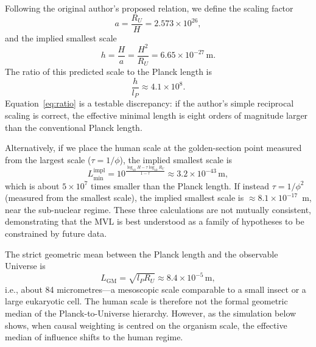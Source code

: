 \documentclass[11pt,a4paper]{article}
\begin{document}
Following the original author's proposed relation, we define the scaling factor
\begin{equation}
a = \frac{R_U}{H} = 2.573\times 10^{26},
\label{eq:a}
\end{equation}
and the implied smallest scale
\begin{equation}
h = \frac{H}{a} = \frac{H^2}{R_U} = 6.65\times 10^{-27}\,\mathrm{m}.
\label{eq:h}
\end{equation}
The ratio of this predicted scale to the Planck length is
\begin{equation}
\frac{h}{l_P} \approx 4.1\times 10^{8}.
\label{eq:ratio}
\end{equation}
Equation~\eqref{eq:ratio} is a testable discrepancy: if the author's simple reciprocal scaling is correct, the effective minimal length is eight orders of magnitude larger than the conventional Planck length.

Alternatively, if we place the human scale at the golden-section point measured from the largest scale ($\tau = 1/\phi$), the implied smallest scale is
\begin{equation}
L_{\min}^{\mathrm{impl}} = 10^{\frac{\log_{10} H - \tau\log_{10} R_U}{1-\tau}}
\approx 3.2\times 10^{-43}\,\mathrm{m},
\label{eq:gs_top}
\end{equation}
which is about $5\times 10^{7}$ times smaller than the Planck length. If instead $\tau = 1/\phi^2$ (measured from the smallest scale), the implied smallest scale is $\approx 8.1\times 10^{-17}$~m, near the sub-nuclear regime. These three calculations are not mutually consistent, demonstrating that the MVL is best understood as a family of hypotheses to be constrained by future data.

The strict geometric mean between the Planck length and the observable Universe is
\begin{equation}
L_{\mathrm{GM}} = \sqrt{l_P R_U} \approx 8.4\times 10^{-5}\,\mathrm{m},
\label{eq:LGM}
\end{equation}
i.e., about 84 micrometres---a mesoscopic scale comparable to a small insect or a large eukaryotic cell. The human scale is therefore not the formal geometric median of the Planck-to-Universe hierarchy. However, as the simulation below shows, when causal weighting is centred on the organism scale, the effective median of influence shifts to the human regime.
\end{document}
